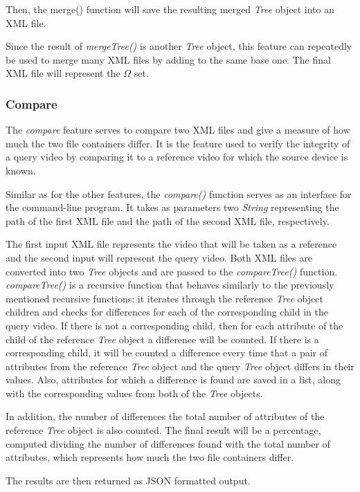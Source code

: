 Then, the merge() function will save the resulting merged \emph{Tree} object into an XML file.

Since the result of \emph{mergeTree()} is another \emph{Tree} object, this feature can repeatedly be used to merge many XML files by adding to the same base one. The final XML file will represent the $\Omega$ set.

\subsubsection*{Compare}

The \emph{compare} feature serves to compare two XML files and give a measure of how much the two file containers differ. It is the feature used to verify the integrity of a query video by comparing it to a reference video for which the source device is known.

Similar as for the other features, the \emph{compare()} function serves as an interface for the command-line program. It takes as parameters two \emph{String} representing the path of the first XML file and the path of the second XML file, respectively.

The first input XML file represents the video that will be taken as a reference and the second input will represent the query video. Both XML files are converted into two \emph{Tree} objects and are passed to the \emph{compareTree()} function. \emph{compareTree()} is a recursive function that behaves similarly to the previously mentioned recursive functions: it iterates through the reference \emph{Tree} object children and checks for differences for each of the corresponding child in the query video. If there is not a corresponding child, then for each attribute of the child of the reference \emph{Tree} object a difference will be counted. If there is a corresponding child, it will be counted a difference every time that a pair of attributes from the reference \emph{Tree} object and the query \emph{Tree} object differs in their values. Also, attributes for which a difference is found are saved in a list, along with the corresponding values from both of the \emph{Tree} objects.

In addition, the number of differences the total number of attributes of the reference \emph{Tree} object is also counted. The final result will be a percentage, computed dividing the number of differences found with the total number of attributes, which represents how much the two file containers differ.

The results are then returned as JSON formatted output.

